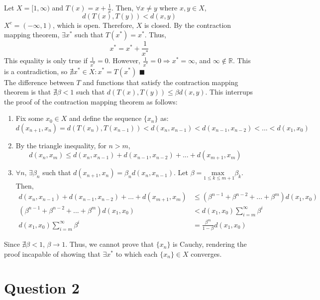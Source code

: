 \documentclass{article}
\newcommand{\R}{\mathbb{R}}
\begin{document}
Let $X=[1,\infty)$ and $T(x)=x+\frac{1}{x}$. Then, $\forall x\neq y$ where $x,y\in X$,
\[
	d(T(x),T(y))<d(x,y)
\]
$X^c=(-\infty,1)$, which is open. Therefore, $X$ is closed. By the contraction mapping theorem, $\exists x^*$ such that $T(x^*)=x^*$. Thus,
\[
	x^*=x^*+\frac{1}{x^*}
\]
This equality is only true if $\frac{1}{x^*}=0$. However, $\frac{1}{x^*}=0\Rightarrow x^*=\infty$, and $\infty\notin\R$. This is a contradiction, so $\nexists x^*\in X:x^*=T(x^*)$ $\blacksquare$
\smallskip \\
The difference between $T$ and functions that satisfy the contraction mapping theorem is that $\nexists\beta<1$ such that $d(T(x),T(y))\leq\beta d(x,y)$. This interrups the proof of the contraction mapping theorem as follows:
\begin{enumerate}
	\item Fix some $x_0\in X$ and define the sequence $\{x_n\}$ as:
		\[
			d(x_{n+1},x_n)=d(T(x_n),T(x_{n-1}))<d(x_n,x_{n-1})<d(x_{n-1},x_{n-2})<...<d(x_1,x_0)
		\]
	
	\item By the triangle inequality, for $n>m$, 
		\[
			d(x_n,x_m)\leq d(x_n,x_{n-1})+d(x_{n-1},x_{n-2})+...+d(x_{m+1},x_m)
		\]
	
	\item $\forall n$, $\exists\beta_n$ such that $d(x_{n+1},x_n)=\beta_n d(x_n,x_{n-1})$. Let $\beta=\underset{1\leq k\leq m+1}{\text{max }}\beta_k$. Then,
		\begin{align*}
			d(x_n,x_{n-1})+d(x_{n-1},x_{n-2})+...+d(x_{m+1},x_m) 	&\leq 	(\beta^{n-1} + \beta^{n-2} + ... + \beta^m)d(x_1,x_0)	\\
			(\beta^{n-1} + \beta^{n-2} + ... + \beta^m)d(x_1,x_0)	&< 		d(x_1,x_0)\sum_{i=m}^\infty \beta^i \\
			d(x_1,x_0)\sum_{i=m}^\infty \beta^i						&=		\frac{\beta^m}{1-\beta}d(x_1,x_0)
		\end{align*}
\end{enumerate}
Since $\nexists\beta<1$, $\beta\rightarrow 1$. Thus, we cannot prove that $\{x_n\}$ is Cauchy, rendering the proof incapable of showing that $\exists x^*$ to which each $\{x_n\}\in X$ converges.




\section*{Question 2}
\end{document}
